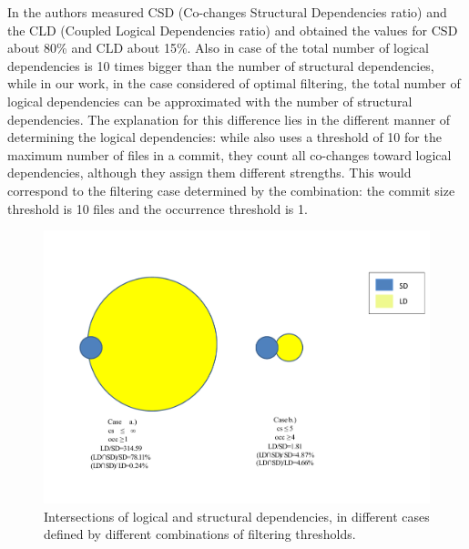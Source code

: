 \documentclass[a4paper,twoside]{article}
\begin{document}
In \cite{DBLP:journals/jss/AjienkaC17} the authors measured CSD (Co-changes Structural Dependencies ratio) and the CLD (Coupled Logical Dependencies ratio) and obtained the values for CSD about 80\% and CLD about 15\%.  Also in case of \cite{DBLP:journals/jss/AjienkaC17}  the total number of logical dependencies is 10 times bigger than the number of structural dependencies, while in our work, in the case considered of optimal filtering,  the total number of logical dependencies can be approximated with the number of structural dependencies. The explanation for this difference lies in the different manner of determining the logical dependencies: while \cite{DBLP:journals/jss/AjienkaC17} also uses a threshold of 10 for the maximum number of files in a commit, they count all co-changes toward logical dependencies, although they assign them different strengths. This would correspond to the filtering case determined by the combination: the commit size threshold is 10 files and the occurrence threshold is 1. 


\begin{figure}[!t]
\centering
\includegraphics[width=5.7in]{figvenn-new.pdf}
\vspace{-1cm}
\caption{Intersections of logical and structural dependencies, in different cases defined by different combinations of filtering thresholds. }
\label{fig_venn}
\end{figure}
\end{document}
